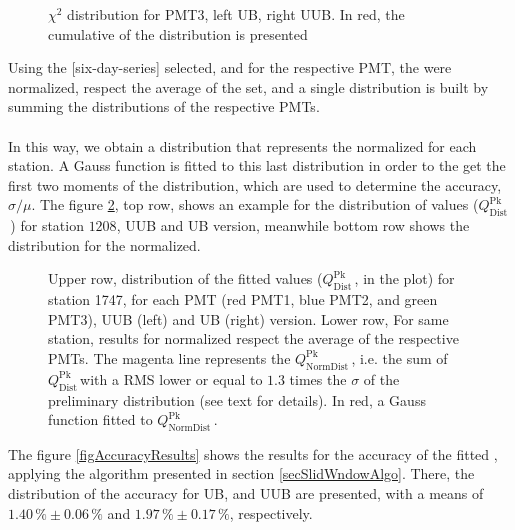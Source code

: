 \documentclass[twoside, final, 10pt]{articleMine}
\newcommand{\qpkDist}{$Q^\mathrm{Pk}_\mathrm{Dist}$\,}
\newcommand{\qpkNormDist}{$Q^\mathrm{Pk}_\mathrm{NormDist}$\,}
\begin{document}
\begin{figure}[!t]
  \centering
  \caption{$\chi^2$ distribution for PMT3, left UB, right UUB. In
  red, the cumulative of the distribution is presented}
  \label{figChi2VsSlopProjChi2Pmt3}
\end{figure}

\noindent Using the [six-day-series] selected, and for the
respective PMT, the \qpkvem were normalized, respect the average
of the set, and a single distribution is built by summing the
distributions of the respective PMTs.\\\\In this way, we obtain a
distribution that represents the \qpkvem normalized for each
station. A Gauss function is fitted to this last distribution in
order to the get the first two moments of the distribution, which
are used to determine the accuracy, $\sigma/\mu$. The figure
\ref{fig1747QpkValues}, top row, shows an example for the
distribution of \qpkvem values (\qpkDist) for station $1208$, UUB
and UB version, meanwhile bottom row shows the distribution for
the \qpkvem normalized.
\clearpage

\begin{figure}[!t]
  \centering
  \caption{Upper row, distribution of the fitted \qpkvem values
  (\qpkDist, in the plot) for station 1747, for each PMT (red
  PMT1, blue PMT2, and green PMT3), UUB (left) and UB (right)
  version. Lower row, For same station, results for \qpkvem
  normalized respect the average of the respective PMTs. The
  magenta line represents the \qpkNormDist, i.e. the sum of
  \qpkDist with a RMS lower or equal to $1.3$ times the $\sigma$
  of the preliminary distribution (see text for details). In red,
  a Gauss function fitted to \qpkNormDist.}
  \label{fig1747QpkValues}
\end{figure}

The figure \ref{figAccuracyResults} shows the results for the
accuracy of the fitted \qpkvem, applying the algorithm presented
in section \ref{secSlidWndowAlgo}. There, the distribution of the
accuracy for UB, and UUB are presented, with a means of
$1.40\,\%\pm0.06\,\%$ and $1.97\,\%\pm0.17\,\%$, respectively.
\clearpage
\end{document}
